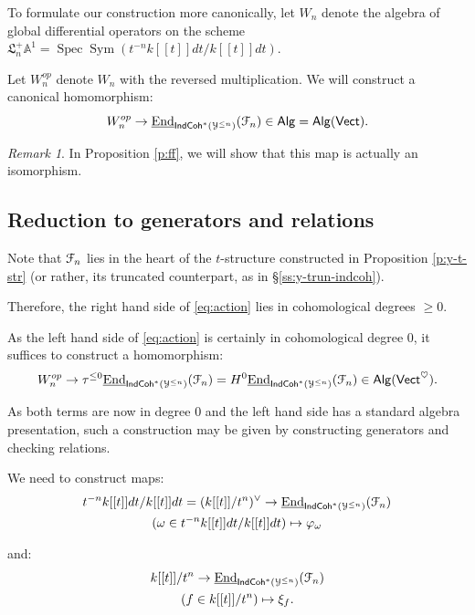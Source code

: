 \documentclass[reqno,11pt]{amsart}
\numberwithin{equation}{subsection}
\theoremstyle{remark}
\newtheorem{rem}[thm]{Remark}
\newcommand{\bA}{{\mathbb A}}
\newcommand{\sF}{{\EuScript F}}
\newcommand{\sY}{{\EuScript Y}}
\newcommand{\fL}{{\mathfrak L}}
\newcommand{\on}{\operatorname}
\newcommand{\ul}{\underline}
\newcommand{\End}{\on{End}}
\newcommand{\Spec}{\on{Spec}}
\newcommand{\vph}{\varphi}
\newcommand{\Vect}{\mathsf{Vect}}
\newcommand{\Sym}{\on{Sym}}
\newcommand{\heart}{\heartsuit}
\newcommand{\IndCoh}{\mathsf{IndCoh}}
\newcommand{\Alg}{\mathsf{Alg}}
\begin{document}
To formulate our construction more canonically, let
$W_n$ denote the algebra of global differential operators
on the scheme $\fL_n^+ \bA^1 = \Spec\Sym(t^{-n}k[[t]]dt/k[[t]]dt)$. 

Let $W_n^{op}$ denote $W_n$ with the reversed multiplication.
We will construct a canonical homomorphism:
%
\begin{equation}\label{eq:action}
W_n^{op} \to \ul{\End}_{\IndCoh^*(\sY^{\leq n})}(\sF_n) \in \Alg = \Alg(\Vect).
\end{equation}

\begin{rem}

In Proposition \ref{p:ff}, we will show that this map is actually an isomorphism. 

\end{rem}

\subsection{Reduction to generators and relations}\label{ss:coconn-reduction}

Note that $\sF_n$ lies in the heart of the $t$-structure constructed
in Proposition \ref{p:y-t-str} (or rather, its truncated counterpart, as in 
\S \ref{ss:y-trun-indcoh}).

Therefore, the right hand side of \eqref{eq:action} 
lies in cohomological degrees $\geq 0$.

As the left hand side of \eqref{eq:action} is certainly in cohomological 
degree $0$, it suffices to construct a homomorphism:
%
\[
W_n^{op} \to \tau^{\leq 0} \ul{\End}_{\IndCoh^*(\sY^{\leq n})}(\sF_n) = 
H^0\ul{\End}_{\IndCoh^*(\sY^{\leq n})}(\sF_n) \in \Alg(\Vect^{\heart}).
\]

As both terms are now in degree $0$ and the left hand side
has a standard algebra presentation, such a construction 
may be given by constructing generators and checking relations.

We need to construct maps:
%
\begin{equation}\label{eq:fns}
\begin{gathered}
t^{-n}k[[t]]dt/k[[t]]dt = (k[[t]]/t^n)^{\vee} \to 
\ul{\End}_{\IndCoh^*(\sY^{\leq n})}(\sF_n) \\
(\omega \in t^{-n}k[[t]]dt/k[[t]]dt) \mapsto \vph_{\omega}
\end{gathered}
\end{equation}

\noindent and:
%
\begin{equation}\label{eq:vfs}
\begin{gathered}
k[[t]]/t^n \to 
\ul{\End}_{\IndCoh^*(\sY^{\leq n})}(\sF_n) \\
(f \in k[[t]]/t^n) \mapsto \xi_{f}.
\end{gathered}
\end{equation}
\end{document}
